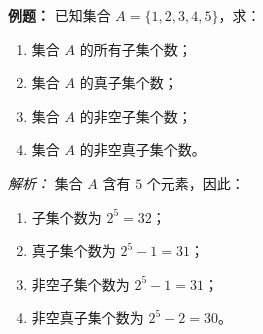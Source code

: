 \begin{examplebox}
\textbf{例题：} 已知集合 $A = \{1,2,3,4,5\}$，求：
\begin{enumerate}
    \item 集合 $A$ 的所有子集个数；
    \item 集合 $A$ 的真子集个数；
    \item 集合 $A$ 的非空子集个数；
    \item 集合 $A$ 的非空真子集个数。
\end{enumerate}

\textit{解析：} 集合 $A$ 含有 $5$ 个元素，因此：
\begin{enumerate}
    \item 子集个数为 $2^5 = 32$；
    \item 真子集个数为 $2^5 - 1 = 31$；
    \item 非空子集个数为 $2^5 - 1 = 31$；
    \item 非空真子集个数为 $2^5 - 2 = 30$。
\end{enumerate}
\end{examplebox}